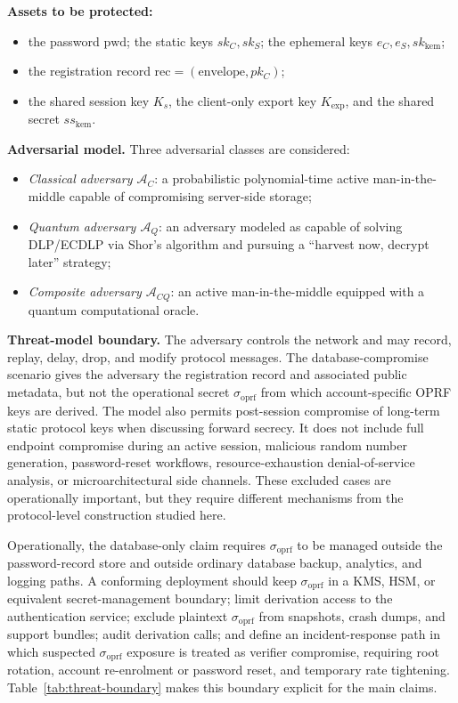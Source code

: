 \documentclass[preprint,12pt]{elsarticle}
\newcommand{\sigoprf}{\sigma_{\mathrm{oprf}}}
\theoremstyle{remark}
\begin{document}
\textbf{Assets to be protected:}
\begin{itemize}
  \item the password $\mathrm{pwd}$; the static keys $sk_C, sk_S$; the
        ephemeral keys $e_C, e_S, sk_{\mathrm{kem}}$;
  \item the registration record
        $\mathrm{rec} = (\mathrm{envelope}, pk_C)$;
  \item the shared session key $K_s$, the client-only export key
        $K_{\mathrm{exp}}$, and the shared secret $ss_{\mathrm{kem}}$.
\end{itemize}

\textbf{Adversarial model.} Three adversarial classes are considered:
\begin{itemize}
  \item \emph{Classical adversary $\mathcal{A}_C$}: a
        probabilistic polynomial-time active man-in-the-middle capable
        of compromising server-side storage;
  \item \emph{Quantum adversary $\mathcal{A}_Q$}: an adversary modeled
        as capable of solving DLP/ECDLP via Shor's algorithm and pursuing a
        ``harvest now, decrypt later'' strategy;
  \item \emph{Composite adversary $\mathcal{A}_{CQ}$}: an active
        man-in-the-middle equipped with a quantum computational oracle.
\end{itemize}

\textbf{Threat-model boundary.} The adversary controls the network and
may record, replay, delay, drop, and modify protocol messages. The
database-compromise scenario gives the adversary the registration
record and associated public metadata, but not the operational secret
$\sigoprf$ from which account-specific OPRF keys are derived. The model
also permits post-session compromise of long-term static protocol keys
when discussing forward secrecy. It does not include
full endpoint compromise during an active session, malicious random
number generation, password-reset workflows, resource-exhaustion
denial-of-service analysis, or microarchitectural side channels. These
excluded cases are operationally important, but they require different
mechanisms from the protocol-level construction studied here.

Operationally, the database-only claim requires $\sigoprf$ to be managed
outside the password-record store and outside ordinary database backup,
analytics, and logging paths. A conforming deployment should keep
$\sigoprf$ in a KMS, HSM, or equivalent secret-management boundary;
limit derivation access to the authentication service; exclude plaintext
$\sigoprf$ from snapshots, crash dumps, and support bundles; audit
derivation calls; and define an incident-response path in which suspected
$\sigoprf$ exposure is treated as verifier compromise, requiring root
rotation, account re-enrolment or password reset, and temporary rate
tightening.
Table~\ref{tab:threat-boundary} makes this boundary explicit for the
main claims.
\end{document}
